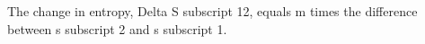 The change in entropy, Delta S subscript 12, equals m times the difference between s subscript 2 and s subscript 1.